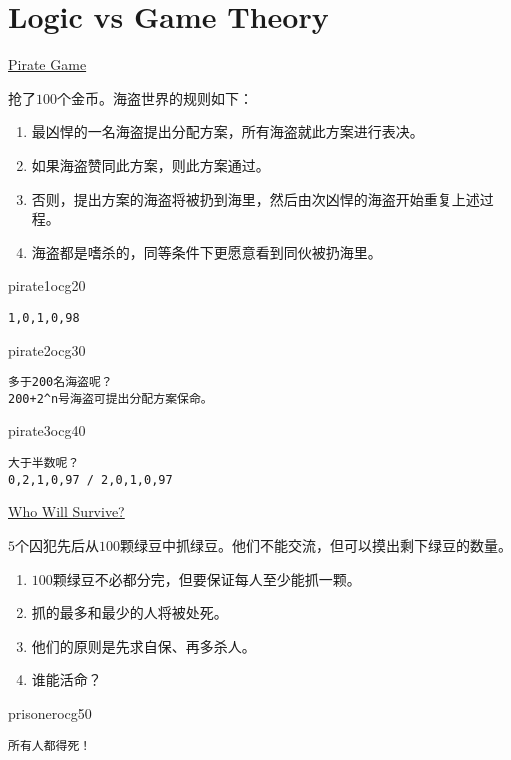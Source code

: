 \documentclass[aspectratio=43,11pt,UTF8,colorlinks,compress]{beamer} %
\begin{document}
\section{Logic vs Game Theory}


\begin{frame}[fragile]{\href{https://mp.weixin.qq.com/s/LLUoU0gl3t6GTh6jDef5vA}{\textcolor{fore}{Pirate Game}}}
	\begin{problem}
		抢了$100$个金币。海盗世界的规则如下：
		\begin{enumerate}
			\item 最凶悍的一名海盗提出分配方案，所有海盗就此方案进行表决。
			\item 如果海盗赞同此方案，则此方案通过。
			\item 否则，提出方案的海盗将被扔到海里，然后由次凶悍的海盗开始重复上述过程。
			\item 海盗都是嗜杀的，同等条件下更愿意看到同伙被扔海里。
		\end{enumerate}
	\end{problem}
\begin{ocg}{pirate1}{ocg2}{0}
\begin{verbatim}
1,0,1,0,98
\end{verbatim}
\end{ocg}
\begin{ocg}{pirate2}{ocg3}{0}
\begin{verbatim}
多于200名海盗呢？
200+2^n号海盗可提出分配方案保命。
\end{verbatim}
\end{ocg}
\begin{ocg}{pirate3}{ocg4}{0}
\begin{verbatim}
大于半数呢？
0,2,1,0,97 / 2,0,1,0,97
\end{verbatim}
\end{ocg}
\end{frame}

\begin{frame}[fragile]{\href{https://www.zhihu.com/question/19912025/answer/99088775}{\textcolor{fore}{Who Will Survive?}}}
	\begin{problem}
		$5$个囚犯先后从$100$颗绿豆中抓绿豆。他们不能交流，但可以摸出剩下绿豆的数量。
		\begin{enumerate}
			\item $100$颗绿豆不必都分完，但要保证每人至少能抓一颗。
			\item 抓的最多和最少的人将被处死。
			\item 他们的原则是先求自保、再多杀人。
			\item 谁能活命？
		\end{enumerate}
	\end{problem}
\begin{ocg}{prisoner}{ocg5}{0}
\begin{verbatim}
所有人都得死！
\end{verbatim}
\end{ocg}
\end{frame}
\end{document}
